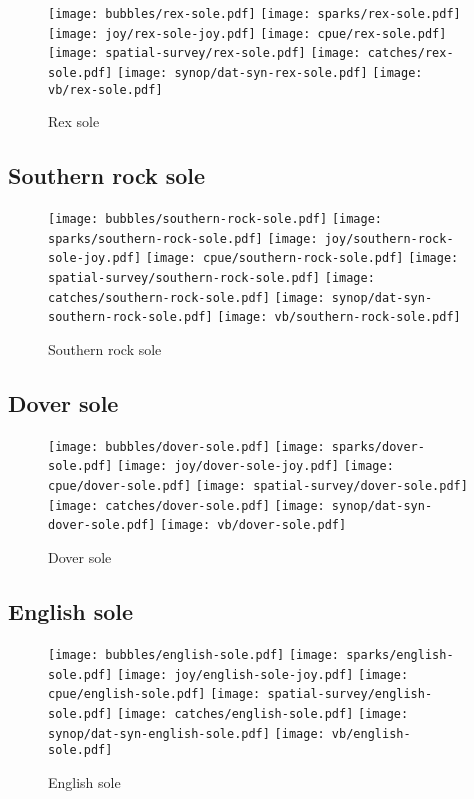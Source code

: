 \begin{figure}[htbp]
\centering
\texttt{[image: bubbles/rex-sole.pdf]}
\texttt{[image: sparks/rex-sole.pdf]}
\texttt{[image: joy/rex-sole-joy.pdf]}
\texttt{[image: cpue/rex-sole.pdf]}
\texttt{[image: spatial-survey/rex-sole.pdf]}
\texttt{[image: catches/rex-sole.pdf]}
\texttt{[image: synop/dat-syn-rex-sole.pdf]}
\texttt{[image: vb/rex-sole.pdf]}
\caption{Rex sole}
\end{figure}
\clearpage
\subsection*{Southern rock sole}

\begin{figure}[htbp]
\centering
\texttt{[image: bubbles/southern-rock-sole.pdf]}
\texttt{[image: sparks/southern-rock-sole.pdf]}
\texttt{[image: joy/southern-rock-sole-joy.pdf]}
\texttt{[image: cpue/southern-rock-sole.pdf]}
\texttt{[image: spatial-survey/southern-rock-sole.pdf]}
\texttt{[image: catches/southern-rock-sole.pdf]}
\texttt{[image: synop/dat-syn-southern-rock-sole.pdf]}
\texttt{[image: vb/southern-rock-sole.pdf]}
\caption{Southern rock sole}
\end{figure}
\clearpage
\subsection*{Dover sole}

\begin{figure}[htbp]
\centering
\texttt{[image: bubbles/dover-sole.pdf]}
\texttt{[image: sparks/dover-sole.pdf]}
\texttt{[image: joy/dover-sole-joy.pdf]}
\texttt{[image: cpue/dover-sole.pdf]}
\texttt{[image: spatial-survey/dover-sole.pdf]}
\texttt{[image: catches/dover-sole.pdf]}
\texttt{[image: synop/dat-syn-dover-sole.pdf]}
\texttt{[image: vb/dover-sole.pdf]}
\caption{Dover sole}
\end{figure}
\clearpage
\subsection*{English sole}

\begin{figure}[htbp]
\centering
\texttt{[image: bubbles/english-sole.pdf]}
\texttt{[image: sparks/english-sole.pdf]}
\texttt{[image: joy/english-sole-joy.pdf]}
\texttt{[image: cpue/english-sole.pdf]}
\texttt{[image: spatial-survey/english-sole.pdf]}
\texttt{[image: catches/english-sole.pdf]}
\texttt{[image: synop/dat-syn-english-sole.pdf]}
\texttt{[image: vb/english-sole.pdf]}
\caption{English sole}
\end{figure}
\clearpage
